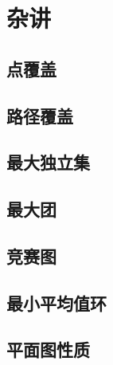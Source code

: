 \section{杂讲}
\subsection{点覆盖}
\subsection{路径覆盖}
\subsection{最大独立集}
\subsection{最大团}
\subsection{竞赛图}
\subsection{最小平均值环}
\subsection{平面图性质}
